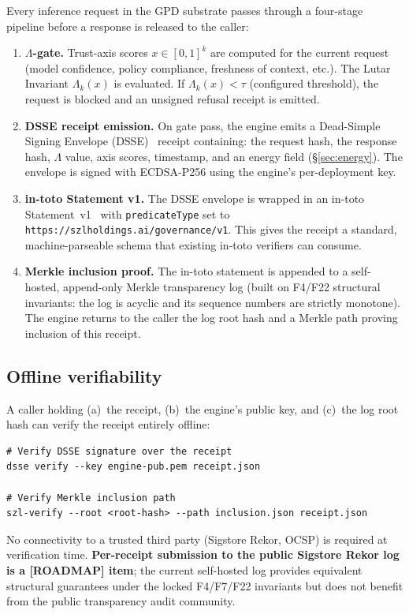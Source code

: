 \documentclass[11pt,letterpaper]{article}
\theoremstyle{definition}
\newcommand{\Lam}{\Lambda}
\newcommand{\roadmap}{\textbf{[ROADMAP]}}
\begin{document}
Every inference request in the GPD substrate passes through a four-stage pipeline
before a response is released to the caller:

\begin{enumerate}
\item \textbf{$\Lam$-gate.}  Trust-axis scores $x \in [0,1]^k$ are computed for
  the current request (model confidence, policy compliance, freshness of context,
  etc.).  The Lutar Invariant $\Lam_k(x)$ is evaluated.  If $\Lam_k(x) < \tau$
  (configured threshold), the request is blocked and an unsigned refusal receipt
  is emitted.

\item \textbf{DSSE receipt emission.}  On gate pass, the engine emits a
  Dead-Simple Signing Envelope (DSSE)~\cite{dsse} receipt containing: the request
  hash, the response hash, $\Lam$ value, axis scores, timestamp, and an energy
  field (\S\ref{sec:energy}).  The envelope is signed with ECDSA-P256 using the
  engine's per-deployment key.

\item \textbf{in-toto Statement v1.}  The DSSE envelope is wrapped in an in-toto
  Statement~v1~\cite{intoto} with \texttt{predicateType} set to
  \texttt{https://szlholdings.ai/governance/v1}.  This gives the receipt a
  standard, machine-parseable schema that existing in-toto verifiers can consume.

\item \textbf{Merkle inclusion proof.}  The in-toto statement is appended to a
  self-hosted, append-only Merkle transparency log (built on F4/F22 structural
  invariants: the log is acyclic and its sequence numbers are strictly
  monotone).  The engine returns to the caller the log root hash and a Merkle
  path proving inclusion of this receipt.
\end{enumerate}

\subsection{Offline verifiability}

A caller holding (a)~the receipt, (b)~the engine's public key, and (c)~the log
root hash can verify the receipt entirely offline:
\begin{lstlisting}
# Verify DSSE signature over the receipt
dsse verify --key engine-pub.pem receipt.json

# Verify Merkle inclusion path
szl-verify --root <root-hash> --path inclusion.json receipt.json
\end{lstlisting}
No connectivity to a trusted third party (Sigstore Rekor, OCSP) is required at
verification time.  \textbf{Per-receipt submission to the public Sigstore Rekor
log is a \roadmap{} item}; the current self-hosted log provides equivalent
structural guarantees under the locked F4/F7/F22 invariants but does not benefit
from the public transparency audit community.
\end{document}
